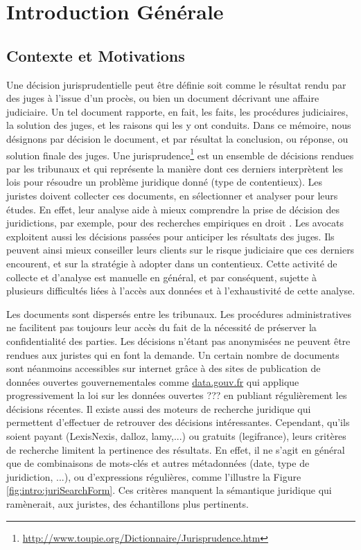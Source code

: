 \chapter*{Introduction Générale}
\label{chap:intro}

\section{Contexte et Motivations}
\label{sec:intro:contexte}
Une décision jurisprudentielle peut être définie soit comme  le résultat rendu par des juges à l'issue d'un procès, ou bien un document décrivant une affaire judiciaire. Un tel document rapporte, en fait,  les faits, les procédures judiciaires, la solution des juges, et les raisons qui les y ont conduits. Dans ce mémoire, nous désignons par \og décision \fg{} le document, et par  \og résultat\fg{} la conclusion, ou réponse, ou solution finale des juges. Une jurisprudence\footnote{\url{http://www.toupie.org/Dictionnaire/Jurisprudence.htm}} est un ensemble de décisions rendues par les tribunaux et qui représente la manière dont ces derniers interprètent les lois pour résoudre un problème juridique donné (type de contentieux). Les juristes doivent collecter ces documents, en sélectionner et analyser pour leurs études. En effet, leur analyse aide à mieux comprendre la prise de décision des juridictions, par exemple, pour des recherches empiriques en droit \citep{ancel2003expulsion, jeandidier2006pensions}. Les avocats exploitent aussi les décisions passées pour anticiper les résultats des juges. Ils peuvent ainsi mieux conseiller leurs clients sur le risque judiciaire que ces derniers encourent, et sur la stratégie à adopter dans un contentieux. Cette activité de collecte et d'analyse est manuelle en général, et par conséquent, sujette à plusieurs difficultés liées à l'accès aux données et à l'exhaustivité de cette analyse. 

Les documents sont dispersés entre les tribunaux. Les procédures administratives ne facilitent pas toujours leur accès du fait de la nécessité de préserver la confidentialité des parties. Les décisions n'étant pas anonymisées ne peuvent être rendues aux juristes qui en font la demande. Un certain nombre de documents sont néanmoins accessibles sur internet grâce à des sites de publication de données ouvertes gouvernementales comme \url{data.gouv.fr} qui applique progressivement la loi sur les données ouvertes ??? en publiant régulièrement les décisions récentes.  Il existe aussi des moteurs de recherche juridique qui permettent d'effectuer de retrouver des décisions intéressantes. Cependant, qu'ils soient payant (LexisNexis, dalloz, lamy,...) ou gratuits (legifrance), leurs critères de recherche limitent la pertinence des résultats. En effet, il ne s'agit en général que de combinaisons de mots-clés et autres métadonnées (date, type de juridiction, ...), ou d'expressions régulières, comme l'illustre la Figure \ref{fig:intro:juriSearchForm}. Ces critères manquent la sémantique juridique qui ramènerait, aux juristes, des échantillons plus pertinents. 

